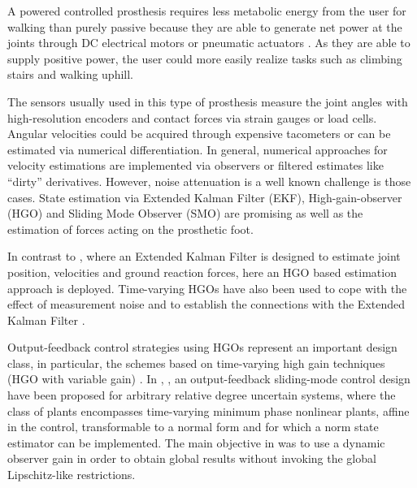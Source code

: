 \documentclass[letterpaper, 10 pt, journal, twocolumn]{IEEEtran}  %
\theoremstyle{plain}
\theoremstyle{definition}
\theoremstyle{remark}
\begin{document}
A powered controlled prosthesis requires less metabolic energy from the user for walking than purely passive because they are able to generate net power at the joints through DC electrical motors or pneumatic actuators \cite{Goldfarb2008} \cite{Bedard2002}. As they are able to supply positive power, the user could more easily realize tasks such as climbing stairs and walking uphill.

The sensors usually used in this type of prosthesis measure the joint angles with high-resolution  encoders and contact forces via strain gauges or load cells. Angular velocities could be acquired through expensive tacometers or can be estimated via numerical differentiation. In general, numerical approaches for velocity estimations are implemented via observers or filtered estimates like ``dirty'' derivatives. However,  noise attenuation  is a well known  challenge is those cases. State estimation via Extended Kalman Filter (EKF), High-gain-observer (HGO) and Sliding Mode Observer (SMO) are promising as well as the estimation of forces acting on the prosthetic foot. 

%
In contrast to \cite{Fakoorian2016}, where an Extended Kalman Filter is designed to estimate joint position, velocities and ground reaction forces, here an HGO based estimation approach is deployed. Time-varying HGOs have also been used to cope with the effect of measurement noise and to establish the connections with the Extended Kalman Filter \cite{AK:07} \cite{AK:09}. 

Output-feedback control strategies using HGOs \cite{OK:97} represent an important design class, in particular, the schemes based on time-varying high gain
techniques (HGO with variable gain) \cite{P:01}\cite{KKJ:02}
\cite{KKC:03}\cite{LL:05}\cite{AK:07}. In \cite{POH:2011}, \cite{PHCL:2007}, an output-feedback sliding-mode control design have been proposed for arbitrary relative degree uncertain systems, where the class of plants encompasses time-varying minimum phase nonlinear plants, affine
in the control, transformable to a normal form and for which a
norm state estimator can be implemented. The main objective in \cite{POH:2011} was to use a dynamic observer gain in order to obtain global results without invoking the global Lipschitz-like restrictions. 
\end{document}
